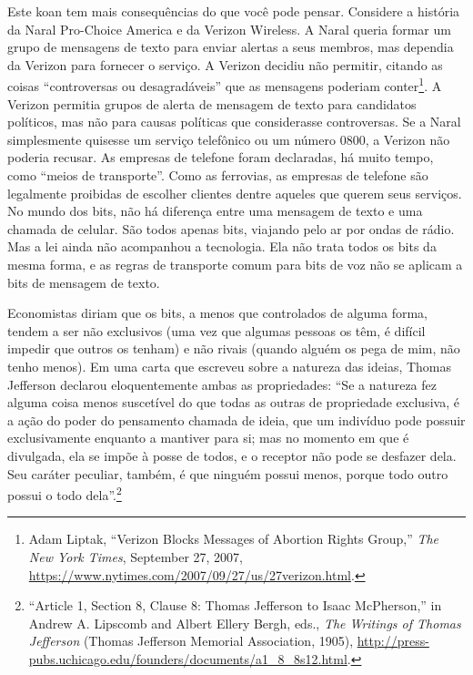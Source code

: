 Este koan tem mais consequências do que você pode pensar. Considere a história
da Naral Pro-Choice America e da Verizon Wireless. A Naral queria formar um
grupo de mensagens de texto para enviar alertas a seus membros, mas dependia da
Verizon para fornecer o serviço. A Verizon decidiu não permitir, citando as
coisas ``controversas ou desagradáveis'' que as mensagens poderiam
conter\footnote{Adam Liptak, ``Verizon Blocks Messages of Abortion Rights
Group,'' \textit{The New York Times}, September 27, 2007,
\url{https://www.nytimes.com/2007/09/27/us/27verizon.html}.}. A Verizon permitia
grupos de alerta de mensagem de texto para candidatos políticos, mas não para
causas políticas que considerasse controversas. Se a Naral simplesmente quisesse
um serviço telefônico ou um número 0800, a Verizon não poderia recusar. As
empresas de telefone foram declaradas, há muito tempo, como ``meios de
transporte''. Como as ferrovias, as empresas de telefone são legalmente
proibidas de escolher clientes dentre aqueles que querem seus serviços. No mundo
dos bits, não há diferença entre uma mensagem de texto e uma chamada de
celular. São todos apenas bits, viajando pelo ar por ondas de rádio. Mas a lei
ainda não acompanhou a tecnologia. Ela não trata todos os bits da mesma forma, e
as regras de transporte comum para bits de voz não se aplicam a bits de mensagem
de texto.

\begin{tcolorbox}[title={Exclusivos e rivais}]
Economistas diriam que os bits, a menos que controlados de alguma forma, tendem
a ser não exclusivos (uma vez que algumas pessoas os têm, é difícil impedir que
outros os tenham) e não rivais (quando alguém os pega de mim, não tenho
menos). Em uma carta que escreveu sobre a natureza das ideias, Thomas Jefferson
declarou eloquentemente ambas as propriedades: ``Se a natureza fez alguma coisa
menos suscetível do que todas as outras de propriedade exclusiva, é a ação do
poder do pensamento chamada de ideia, que um indivíduo pode possuir
exclusivamente enquanto a mantiver para si; mas no momento em que é divulgada,
ela se impõe à posse de todos, e o receptor não pode se desfazer dela. Seu
caráter peculiar, também, é que ninguém possui menos, porque todo outro possui o
todo dela''.\footnote{``Article 1, Section 8, Clause 8: Thomas Jefferson to
Isaac McPherson,'' in Andrew A. Lipscomb and Albert Ellery Bergh, eds.,
\textit{The Writings of Thomas Jefferson} (Thomas Jefferson Memorial
Association, 1905),
\url{http://press-pubs.uchicago.edu/founders/documents/a1_8_8s12.html}.}
\end{tcolorbox}

